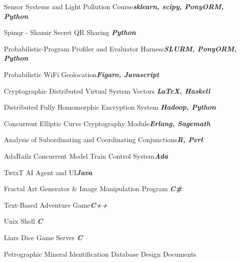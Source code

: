 \documentclass{article}
\newenvironment{*mylist}[2]{
  \subsubsection*{#1\hfill\small#2}
  \small
  \begin{list}{}{}
   \setlength{\topsep}{0pt}
   \setlength{\itemsep}{1pt}
   \setlength{\parskip}{0pt}
   \setlength{\parsep}{0pt}}{\end{list}\normalsize}
\newcommand{\LUx}[1]{{\bf\em #1}}
\begin{document}
\small
\vspace{-.08in}\begin{*mylist}{}{}
\item Sensor Systems and Light Pollution Course\hfill\LUx{sklearn, scipy, PonyORM, Python}
\item Spinqr - Shamir Secret QR Sharing \hfill\LUx{Python}
\item Probabilistic-Program Profiler and Evaluator Harness\hfill\LUx{SLURM, PonyORM, Python}
\item Probabilistic WiFi Geolocation\hfill\LUx{Figaro, Javascript}
\item Cryptographic Distributed Virtual System Vectors \hfill\LUx{\LaTeX, Haskell}
\item Distributed Fully Homomorphic Encryption System \hfill\LUx{Hadoop, Python}
\item Concurrent Elliptic Curve Cryptography Module\hfill\LUx{Erlang, Sagemath}
\item Analysis of Subordinating and Coordinating Conjunctions\hfill\LUx{R, Perl}
\item AdaRailz Concurrent Model Train Control System\hfill\LUx{Ada}
\item TwixT AI Agent and UI\hfill\LUx{Java}
\item Fractal Art Generator \& Image Manipulation Program \hfill\LUx{C\#}
\item Text-Based Adventure Game\hfill\LUx{C++}
\item Unix Shell \hfill\LUx{C}
\item Liars Dice Game Server \hfill\LUx{C}
\item Petrographic Mineral Identification Database Design Documents
\end{*mylist}
\end{document}
